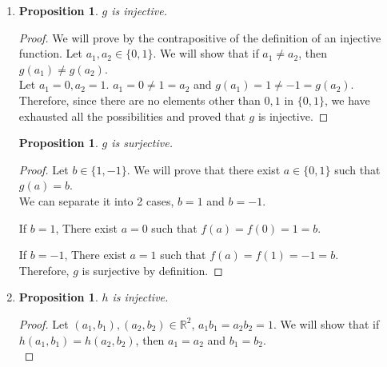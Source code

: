 \documentclass{article}
\newtheorem{prop}[thm]{Proposition}
\begin{document}
\begin{enumerate}
\begin{enumerate}
\begin{proof}
    We can separate it into 2 cases, $b = 0$ and $b = 1$. 
    
    If $b = 0$, There exist $a = 0$ such that $f(a) = f(0) = 0 = b$. 
    
    If $b = 1$, There exist $a = 1$ such that $f(a) = f(1) = 1 = b$. \\
    
    Therefore, we have exhausted all possibilities of $b$ and shown that $f$ is surjective by definition.
    \end{proof}
    
    \item 
    \begin{prop}
      $g$ is injective.
    \end{prop}
    \begin{proof}
    We will prove by the contrapositive of the definition of an injective function. Let $a_1, a_2 \in \{0, 1\}$. We will show that if $a_1 \neq a_2$, then $g(a_1) \neq g(a_2)$. \\
    
    Let $a_1 = 0, a_2 = 1$. $a_1 = 0 \neq 1 = a_2$ and $g(a_1) = 1 \neq -1 = g(a_2)$. \\
    
    Therefore, since there are no elements other than $0,1$ in $\{0, 1\}$, we have exhausted all the possibilities and proved that $g$ is injective.
    \end{proof}
    
    \begin{prop}
      $g$ is surjective.
    \end{prop}
    \begin{proof}
    Let $b \in \{1, -1\}$. We will prove that there exist $a \in \{0, 1\}$ such that $g(a) = b$. \\
    
    We can separate it into 2 cases, $b = 1$ and $b = -1$. 
    
    If $b = 1$, There exist $a = 0$ such that $f(a) = f(0) = 1 = b$. 
    
    If $b = -1$, There exist $a = 1$ such that $f(a) = f(1) = -1 = b$. \\
    
    Therefore, $g$ is surjective by definition.
    \end{proof}
    
    \item 
    \begin{prop}
      $h$ is injective.
    \end{prop}
    \begin{proof}
    Let $(a_1, b_1), (a_2, b_2) \in \mathbb{R}^2$, $a_1b_1 = a_2b_2 = 1$. We will show that if $h(a_1, b_1) = h(a_2, b_2)$, then $a_1 = a_2$ and $b_1 = b_2$. \\
    

\end{proof}
\end{enumerate}
\end{enumerate}
\end{document}
